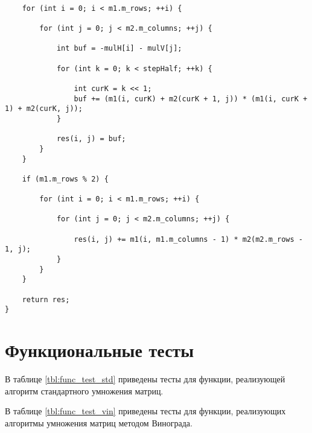 \clearpage

\begin{lstlisting}[label=lst:vin_opt_2, caption=Функция умножения матриц оптимизированным методом Винограда (часть 2)]

    for (int i = 0; i < m1.m_rows; ++i) {

        for (int j = 0; j < m2.m_columns; ++j) {

            int buf = -mulH[i] - mulV[j];

            for (int k = 0; k < stepHalf; ++k) {

                int curK = k << 1;
                buf += (m1(i, curK) + m2(curK + 1, j)) * (m1(i, curK + 1) + m2(curK, j));
            }

            res(i, j) = buf;
        }
    }

    if (m1.m_rows % 2) {

        for (int i = 0; i < m1.m_rows; ++i) {

            for (int j = 0; j < m2.m_columns; ++j) { 

                res(i, j) += m1(i, m1.m_columns - 1) * m2(m2.m_rows - 1, j);
            }
        }
    }

    return res;
} 
\end{lstlisting}

\section{Функциональные тесты}
В таблице \ref{tbl:func_test_std} приведены тесты для функции, реализующей алгоритм стандартного умножения матриц.

В таблице \ref{tbl:func_test_vin} приведены тесты для функции, реализующих алгоритмы умножения матриц методом Винограда.

